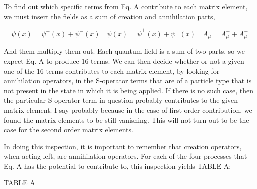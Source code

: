 \documentclass[a4]{article}
\begin{document}
    To find out which specific terms from Eq. A contribute to each matrix element, we must insert the fields as a sum of creation and annihilation parts,

    \begin{equation}
        \psi (x) = \psi^{+} (x) + \psi^{-} (x) \quad \bar{\psi} (x) = \bar{\psi}^{+} (x) + \bar{\psi}^{-} (x) \quad A_{\mu} = A_{\mu}^{+} + A_{\mu}^{-}
    \end{equation}

    And them multiply them out. Each quantum field is a sum of two parts, so we expect Eq. A to produce 16 terms. We can then decide whether or not a given
    one of the 16 terms contributes to each matrix element, by looking for annihilation operators, in the S-operator terms that are of a particle type that
    is not present in the state in which it is being applied. If there is no such case, then the particular S-operator term in question probably contributes
    to the given matrix element. I say probably because in the case of first order contribution, we found the matrix elements to be still vanishing. This
    will not turn out to be the case for the second order matrix elements.

    In doing this inspection, it is important to remember that creation operators, when acting left, are annihilation operators. For each of the four
    processes that Eq. A has the potential to contribute to, this inspection yields TABLE A:

    \begin{center}
        TABLE A
    \end{center}
\end{document}
